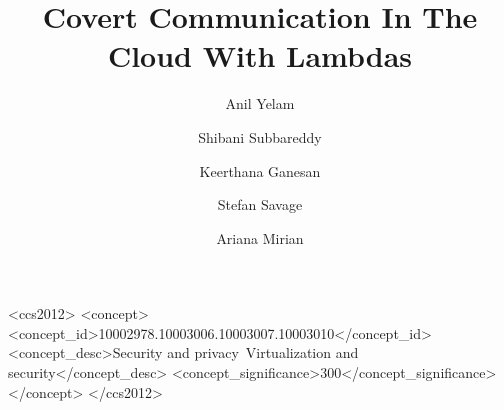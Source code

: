 \documentclass[sigconf,review]{acmart}
\begin{document}
\sloppy

\title[Covert Communication In The Cloud With Lambdas]
{Covert Communication In The Cloud With Lambdas} %

\author{Anil Yelam}

\author{Shibani Subbareddy}

\author{Keerthana Ganesan}
\authornotemark[1]

\author{Stefan Savage}

\author{Ariana Mirian}






\begin{CCSXML}
<ccs2012>
<concept>
<concept_id>10002978.10003006.10003007.10003010</concept_id>
<concept_desc>Security and privacy~Virtualization and security</concept_desc>
<concept_significance>300</concept_significance>
</concept>
</ccs2012>
\end{CCSXML}
\end{document}
